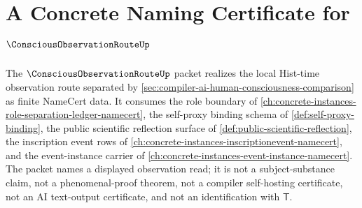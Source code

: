 \chapter{A Concrete Naming Certificate for $\ConsciousObservationRouteUp$}
\label{ch:concrete-instances-conscious-observation-route-namecert}

The $\ConsciousObservationRouteUp$ packet realizes the local Hist-time observation route separated by \autoref{sec:compiler-ai-human-consciousness-comparison} as finite NameCert data. It consumes the role boundary of \autoref{ch:concrete-instances-role-separation-ledger-namecert}, the self-proxy binding schema of \autoref{def:self-proxy-binding}, the public scientific reflection surface of \autoref{def:public-scientific-reflection}, the inscription event rows of \autoref{ch:concrete-instances-inscriptionevent-namecert}, and the event-instance carrier of \autoref{ch:concrete-instances-event-instance-namecert}. The packet names a displayed observation read; it is not a subject-substance claim, not a phenomenal-proof theorem, not a compiler self-hosting certificate, not an AI text-output certificate, and not an identification with $\mathsf{T}$.

